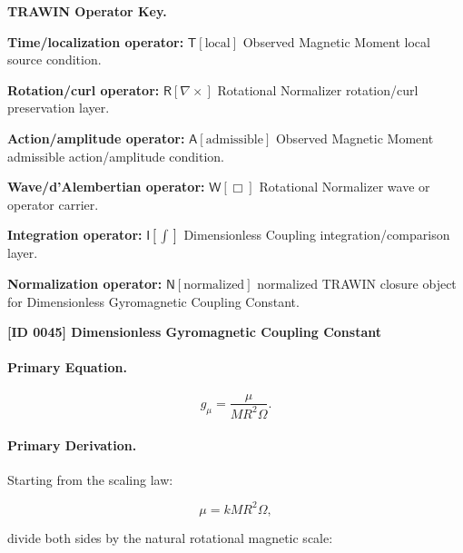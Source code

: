 \par\vspace{0.45\baselineskip}
\noindent\begin{minipage}[t]{\linewidth}
\begingroup
\small
\raggedright
\textbf{TRAWIN Operator Key.}\par
\noindent\textbf{Time/localization operator:} $\mathsf{T}\!\left[\mathrm{local}\right]$ Observed Magnetic Moment local source condition.\par
\noindent\textbf{Rotation/curl operator:} $\mathsf{R}\!\left[\nabla\times\right]$ Rotational Normalizer rotation/curl preservation layer.\par
\noindent\textbf{Action/amplitude operator:} $\mathsf{A}\!\left[\mathrm{admissible}\right]$ Observed Magnetic Moment admissible action/amplitude condition.\par
\noindent\textbf{Wave/d'Alembertian operator:} $\mathsf{W}\!\left[\Box\right]$ Rotational Normalizer wave or operator carrier.\par
\noindent\textbf{Integration operator:} $\mathsf{I}\!\left[\int\right]$ Dimensionless Coupling integration/comparison layer.\par
\noindent\textbf{Normalization operator:} $\mathsf{N}\!\left[\mathrm{normalized}\right]$ normalized TRAWIN closure object for Dimensionless Gyromagnetic Coupling Constant.\par
\endgroup
\end{minipage}

\clearpage
\noindent\textbf{[ID 0045] Dimensionless Gyromagnetic Coupling Constant}\par
\vspace{0.35em}
\paragraph{Primary Equation.}
\begin{equation}
g_{\mu}
=
\frac{\mu}
{MR^2\Omega}.
\end{equation}

\paragraph{Primary Derivation.}
Starting from the scaling law:

\begin{equation}
\mu
=
kMR^2\Omega ,
\end{equation}

divide both sides by the natural rotational magnetic scale:

